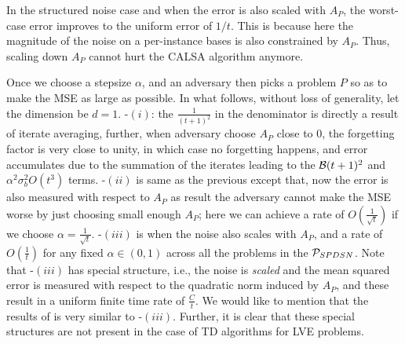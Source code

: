 In the structured noise case and when the error is also scaled with $A_P$, the worst-case error improves to 
the uniform error of $1/t$. This is because here the magnitude of the noise on a per-instance bases is also constrained
by $A_P$. Thus, scaling down $A_P$ cannot hurt the CALSA algorithm anymore.


Once we choose a stepsize $\alpha$, and an adversary then picks a problem $P$ so as to make the MSE as large as possible.  In what follows, without loss of generality, let the dimension be $d=1$.
-$(i)$: the $\frac{1}{(t+1)^2}$ in the denominator is directly a result of iterate averaging,  further, when adversary choose $A_P$ close to $0$, the forgetting factor is very close to unity, in which case no forgetting happens, and error accumulates due to the summation of the iterates leading to the $\B(t+1)^2$ and $\alpha^2 \sigma_b^2 O(t^3)$ terms. -$(ii)$ is same as the previous except that, now the error is also measured with respect to $A_P$ as result the adversary cannot make the MSE worse by just choosing small enough $A_P$; here we can achieve a rate of $O(\frac{1}{\sqrt{t}})$ if we choose $\alpha=\frac{1}{\sqrt{t}}$. -$(iii)$ is when the noise also scales with $A_P$, and a rate of $O(\frac{1}{t})$ for any fixed $\alpha\in(0,1)$ across all the problems in the $\P_{SPDSN}$. Note that -$(iii)$ has special structure, i.e., the noise is \emph{scaled} and the mean squared error is measured with respect to the quadratic norm induced by $A_P$, and these result in a uniform finite time rate of $\frac{C}{t}$. We would like to mention that the results of \citet{bach} is very similar to  -$(iii)$. Further, it is clear that these special structures are not present in the case of TD algorithms for LVE problems.

